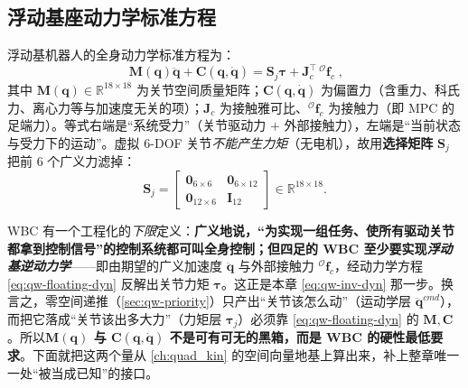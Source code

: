 \subsection{浮动基座动力学标准方程}
\label{subsec:qw-floating-dyn}

浮动基机器人的全身动力学标准方程为\cite{yu2021quadruped}：
\begin{equation}
  \boxed{\;\boldsymbol{M}(\boldsymbol{q})\ddot{\boldsymbol{q}}+\boldsymbol{C}(\boldsymbol{q},\dot{\boldsymbol{q}})=\boldsymbol{S}_j\boldsymbol{\tau}+\boldsymbol{J}_c^\top\,{}^{\mathcal{O}}\boldsymbol{f}_c\;},
  \label{eq:qw-floating-dyn}
\end{equation}
其中 $\boldsymbol{M}(\boldsymbol{q})\in\mathbb{R}^{18\times18}$ 为关节空间质量矩阵；$\boldsymbol{C}(\boldsymbol{q},\dot{\boldsymbol{q}})$ 为偏置力（含重力、科氏力、离心力等与加速度无关的项）；$\boldsymbol{J}_c$ 为接触雅可比、${}^{\mathcal{O}}\boldsymbol{f}_c$ 为接触力（即 MPC 的足端力）。等式右端是“系统受力”（关节驱动力 $+$ 外部接触力），左端是“当前状态与受力下的运动”。虚拟 $6$-DOF 关节\emph{不能产生力矩}（无电机），故用\textbf{选择矩阵} $\boldsymbol{S}_j$ 把前 $6$ 个广义力滤掉\cite{yu2021quadruped}：
\begin{equation}
  \boldsymbol{S}_j=\begin{bmatrix}\mathbf{0}_{6\times6}&\mathbf{0}_{6\times12}\\\mathbf{0}_{12\times6}&\mathbf{I}_{12}\end{bmatrix}\in\mathbb{R}^{18\times18}.
  \label{eq:qw-Sj}
\end{equation}

\begin{insight}\label{ins:qw-wbc-min-id}
WBC 有一个工程化的\emph{下限}定义：\textbf{广义地说，“为实现一组任务、使所有驱动关节都拿到控制信号”的控制系统都可叫全身控制；但四足的 WBC 至少要实现\emph{浮动基逆动力学}}——即由期望的广义加速度 $\ddot{\boldsymbol{q}}$ 与外部接触力 ${}^{\mathcal{O}}\boldsymbol{f}_c$，经动力学方程 \cref{eq:qw-floating-dyn} 反解出关节力矩 $\boldsymbol{\tau}$。这正是本章 \cref{eq:qw-inv-dyn} 那一步。换言之，零空间递推（\cref{sec:qw-priority}）只产出“关节该怎么动”（运动学层 $\ddot{\boldsymbol{q}}^{cmd}$），而把它落成“关节该出多大力”（力矩层 $\boldsymbol{\tau}_j$）必须靠 \cref{eq:qw-floating-dyn} 的 $\boldsymbol{M},\boldsymbol{C}$。所以\textbf{$\boldsymbol{M}(\boldsymbol{q})$ 与 $\boldsymbol{C}(\boldsymbol{q},\dot{\boldsymbol{q}})$ 不是可有可无的黑箱，而是 WBC 的硬性最低要求}。下面就把这两个量从 \cref{ch:quad_kin} 的空间向量地基上算出来，补上整章唯一一处“被当成已知”的接口。
\end{insight}

